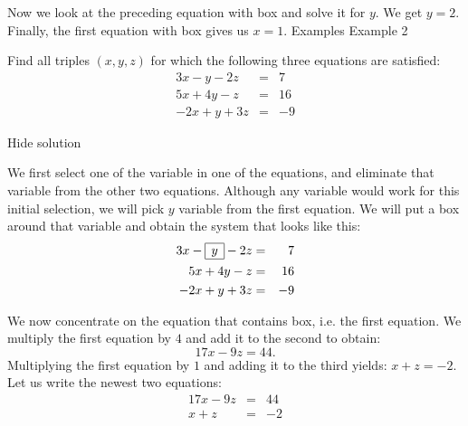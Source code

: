 Now we look at the preceding equation with box and solve it for \( y \). We get \( y=2 \). Finally, the first equation with box gives us \( x=1 \).
Examples
Example 2


Find all triples \( (x,y,z) \) for which the following three equations are satisfied: \begin{eqnarray*} 3x-y-2z&=&7\\ 5x+4y-z&=&16\\ -2x+y+3z&=&-9 \end{eqnarray*}

Hide solution

We first select one of the variable in one of the equations, and eliminate that variable from the other two equations. Although any variable would work for this initial selection, we will pick \( y \) variable from the first equation. We will put a box around that variable and obtain the system that looks like this:
\begin{eqnarray*} 3x- \begin{array}{|c|}\hline y\\\hline \end{array}-2z&=&7\\ 5x+4y-z&=&16\\ -2x+y+3z&=&-9 \end{eqnarray*}

We now concentrate on the equation that contains box, i.e. the first equation. We multiply the first equation by \( 4 \) and add it to the second to obtain: \[ 17x-9z=44.\] Multiplying the first equation by \( 1 \) and adding it to the third yields: \( x+z=-2 \). Let us write the newest two equations: \begin{eqnarray*} 17x -9z&=&44\\ x+z&=&-2 \end{eqnarray*}

